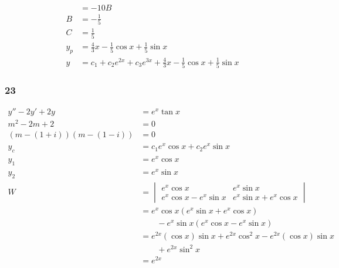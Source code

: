 \documentclass{article}
\begin{document}
\begin{align*}
                      & = -10 B                                                                                     \\
  B                   & = -\frac{1}{5}                                                                              \\
  C                   & = \frac{1}{5}                                                                               \\
  y_p                 & = \frac{4}{3} x - \frac{1}{5} \cos x + \frac{1}{5} \sin x                                   \\
  y                   & = c_1 + c_2 e^{2 x} + c_3 e^{3 x} + \frac{4}{3} x - \frac{1}{5} \cos x + \frac{1}{5} \sin x
\end{align*}

\subsubsection{23}

\begin{align*}
  y'' - 2 y' + 2 y            & = e^x \tan x                                                           \\
  m^2 - 2 m + 2               & = 0                                                                    \\
  (m - (1 + i)) (m - (1 - i)) & = 0                                                                    \\
  y_c                         & = c_1 e^x \cos x + c_2 e^x \sin x                                      \\
  y_1                         & = e^x \cos x                                                           \\
  y_2                         & = e^x \sin x                                                           \\
  W                           & = \begin{vmatrix}
                                    e^x \cos x              & e^x \sin x              \\
                                    e^x \cos x - e^x \sin x & e^x \sin x + e^x \cos x
                                  \end{vmatrix}                    \\
                              & = e^x \cos x (e^x \sin x + e^x \cos x)                                 \\
                              & \qquad - e^x \sin x (e^x \cos x - e^x \sin x)                          \\
                              & = e^{2 x} (\cos x) \sin x + e^{2 x} \cos^2 x - e^{2 x} (\cos x) \sin x \\
                              & \qquad + e^{2 x} \sin^2 x                                              \\
                              & = e^{2 x}
\end{align*}
\end{document}
